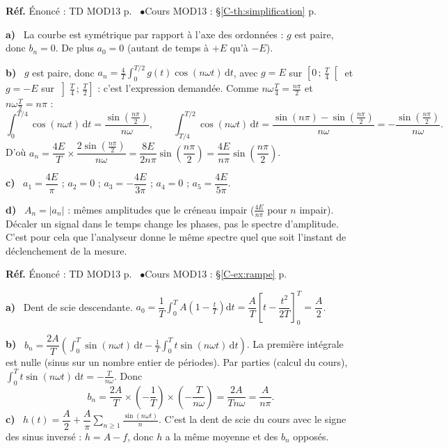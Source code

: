 \documentclass[a4paper,11pt]{article}
\newcommand{\cours}[1]{§\ref{C-#1} p.~\pageref{C-#1}}
\newcommand{\source}[2]{{\footnotesize\color{uimmgray}\textbf{Réf.} \enspace Énoncé : TD MOD13 p.~\pageref{T-#1} \enspace$\bullet$\enspace Cours MOD13 : #2}\par\smallskip}
\newcommand{\q}[1]{\textbf{\color{uimmblue}#1}\ }
\begin{document}
\begin{correction}
\source{exo:8}{\cours{th:simplification}}
\q{a)} La courbe est symétrique par rapport à l'axe des ordonnées : $g$ est paire, donc $b_n = 0$. De plus $a_0 = 0$ (autant de temps à $+E$ qu'à $-E$).

\q{b)} $g$ est paire, donc $a_n = \frac4T\int_0^{T/2}g(t)\cos(n\omega t)\,\mathrm dt$, avec $g = E$ sur $\left[0\,;\,\frac T4\right[$ et $g = -E$ sur $\left]\frac T4\,;\,\frac T2\right]$ : c'est l'expression demandée. Comme $n\omega\frac T4 = \frac{n\pi}{2}$ et $n\omega\frac T2 = n\pi$ :
\[
\int_0^{T/4}\cos(n\omega t)\,\mathrm dt = \frac{\sin\left(\frac{n\pi}{2}\right)}{n\omega},
\qquad
\int_{T/4}^{T/2}\cos(n\omega t)\,\mathrm dt = \frac{\sin(n\pi) - \sin\left(\frac{n\pi}{2}\right)}{n\omega} = -\frac{\sin\left(\frac{n\pi}{2}\right)}{n\omega}.
\]
D'où $a_n = \dfrac{4E}{T}\times\dfrac{2\sin\left(\frac{n\pi}{2}\right)}{n\omega} = \dfrac{8E}{2n\pi}\sin\left(\dfrac{n\pi}{2}\right) = \dfrac{4E}{n\pi}\sin\left(\dfrac{n\pi}{2}\right)$.

\q{c)} $a_1 = \dfrac{4E}{\pi}$ ; $a_2 = 0$ ; $a_3 = -\dfrac{4E}{3\pi}$ ; $a_4 = 0$ ; $a_5 = \dfrac{4E}{5\pi}$.

\q{d)} $A_n = |a_n|$ : mêmes amplitudes que le créneau impair ($\frac{4E}{n\pi}$ pour $n$ impair). Décaler un signal dans le temps change les phases, pas le spectre d'amplitude. C'est pour cela que l'analyseur donne le même spectre quel que soit l'instant de déclenchement de la mesure.
\end{correction}

\begin{correction}
\source{exo:9}{\cours{ex:rampe}}
\q{a)} Dent de scie descendante. $a_0 = \dfrac1T\displaystyle\int_0^T A\left(1 - \frac tT\right)\mathrm dt = \dfrac AT\left[t - \dfrac{t^2}{2T}\right]_0^T = \dfrac A2$.

\q{b)} $b_n = \dfrac{2A}{T}\left(\displaystyle\int_0^T\sin(n\omega t)\,\mathrm dt - \frac1T\int_0^T t\sin(n\omega t)\,\mathrm dt\right)$. La première intégrale est nulle (sinus sur un nombre entier de périodes). Par parties (calcul du cours), $\int_0^T t\sin(n\omega t)\,\mathrm dt = -\frac{T}{n\omega}$. Donc
\[
b_n = \frac{2A}{T}\times\left(-\frac1T\right)\times\left(-\frac{T}{n\omega}\right) = \frac{2A}{Tn\omega} = \frac{A}{n\pi}.
\]
\q{c)} $h(t) = \dfrac A2 + \dfrac A\pi\displaystyle\sum_{n\geq1}\frac{\sin(n\omega t)}{n}$. C'est la dent de scie du cours avec le signe des sinus inversé : $h = A - f$, donc $h$ a la même moyenne et des $b_n$ opposés.
\end{correction}
\end{document}
